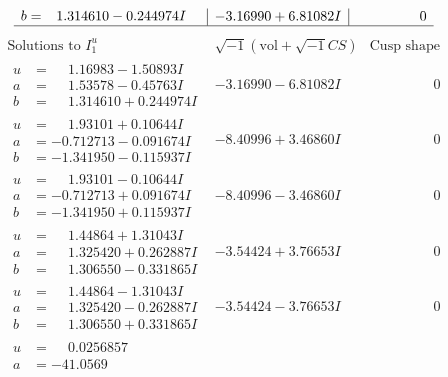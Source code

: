 \documentclass[1p]{elsarticle_modified}
\theoremstyle{definition}
\newcommand{\I}{\sqrt{-1}}
\begin{document}
$$\begin{array}{c|c|c}
\begin{aligned}
b &= \phantom{-}1.314610 - 0.244974 I\end{aligned}
 & -3.16990 + 6.81082 I & \phantom{-0.000000 } 0\\
 \hline 
 \end{array}$$\newpage$$\begin{array}{c|c|c}  
\text{Solutions to }I^u_{1}& \I (\text{vol} + \sqrt{-1}CS) & \text{Cusp shape}\\
 \hline 
\begin{aligned}
u &= \phantom{-}1.16983 - 1.50893 I \\
a &= \phantom{-}1.53578 - 0.45763 I \\
b &= \phantom{-}1.314610 + 0.244974 I\end{aligned}
 & -3.16990 - 6.81082 I & \phantom{-0.000000 } 0 \\ \hline\begin{aligned}
u &= \phantom{-}1.93101 + 0.10644 I \\
a &= -0.712713 - 0.091674 I \\
b &= -1.341950 - 0.115937 I\end{aligned}
 & -8.40996 + 3.46860 I & \phantom{-0.000000 } 0 \\ \hline\begin{aligned}
u &= \phantom{-}1.93101 - 0.10644 I \\
a &= -0.712713 + 0.091674 I \\
b &= -1.341950 + 0.115937 I\end{aligned}
 & -8.40996 - 3.46860 I & \phantom{-0.000000 } 0 \\ \hline\begin{aligned}
u &= \phantom{-}1.44864 + 1.31043 I \\
a &= \phantom{-}1.325420 + 0.262887 I \\
b &= \phantom{-}1.306550 - 0.331865 I\end{aligned}
 & -3.54424 + 3.76653 I & \phantom{-0.000000 } 0 \\ \hline\begin{aligned}
u &= \phantom{-}1.44864 - 1.31043 I \\
a &= \phantom{-}1.325420 - 0.262887 I \\
b &= \phantom{-}1.306550 + 0.331865 I\end{aligned}
 & -3.54424 - 3.76653 I & \phantom{-0.000000 } 0 \\ \hline\begin{aligned}
u &= \phantom{-}0.0256857\phantom{ +0.000000I} \\
a &= -41.0569\phantom{ +0.000000I} \\

\end{aligned}
\end{array}$$
\end{document}
